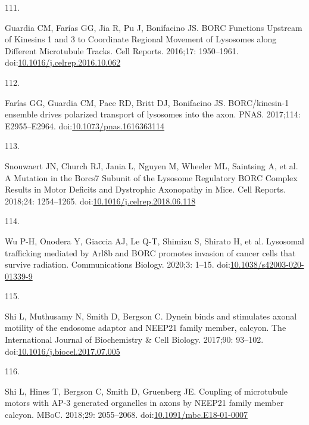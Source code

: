 \documentclass[
  12pt,
  a4paper,
]{book}
\newlength{\cslhangindent}
\newlength{\csllabelwidth}
\newlength{\cslentryspacingunit} %
\newenvironment{CSLReferences}[2] %
 {%
  \setlength{\parindent}{0pt}
  \ifodd #1
  \let\oldpar\par
  \def\par{\hangindent=\cslhangindent\oldpar}
  \fi
  \setlength{\parskip}{#2\cslentryspacingunit}
 }%
 {}
\newcommand{\CSLLeftMargin}[1]{\parbox[t]{\csllabelwidth}{#1}}
\newcommand{\CSLRightInline}[1]{\parbox[t]{\linewidth - \csllabelwidth}{#1}\break}
\begin{document}
\begin{CSLReferences}{0}{0}
\leavevmode{}%
\CSLLeftMargin{111. }%
\CSLRightInline{Guardia CM, Farías GG, Jia R, Pu J, Bonifacino JS. {BORC Functions Upstream} of {Kinesins} 1 and 3 to {Coordinate Regional Movement} of {Lysosomes} along {Different Microtubule Tracks}. Cell Reports. 2016;17: 1950--1961. doi:\href{https://doi.org/10.1016/j.celrep.2016.10.062}{10.1016/j.celrep.2016.10.062}}

\leavevmode{}%
\CSLLeftMargin{112. }%
\CSLRightInline{Farías GG, Guardia CM, Pace RD, Britt DJ, Bonifacino JS. {BORC}/kinesin-1 ensemble drives polarized transport of lysosomes into the axon. PNAS. 2017;114: E2955--E2964. doi:\href{https://doi.org/10.1073/pnas.1616363114}{10.1073/pnas.1616363114}}

\leavevmode{}%
\CSLLeftMargin{113. }%
\CSLRightInline{Snouwaert JN, Church RJ, Jania L, Nguyen M, Wheeler ML, Saintsing A, et al. A {Mutation} in the {Borcs7 Subunit} of the {Lysosome Regulatory BORC Complex Results} in {Motor Deficits} and {Dystrophic Axonopathy} in {Mice}. Cell Reports. 2018;24: 1254--1265. doi:\href{https://doi.org/10.1016/j.celrep.2018.06.118}{10.1016/j.celrep.2018.06.118}}

\leavevmode{}%
\CSLLeftMargin{114. }%
\CSLRightInline{Wu P-H, Onodera Y, Giaccia AJ, Le Q-T, Shimizu S, Shirato H, et al. Lysosomal trafficking mediated by {Arl8b} and {BORC} promotes invasion of cancer cells that survive radiation. Communications Biology. 2020;3: 1--15. doi:\href{https://doi.org/10.1038/s42003-020-01339-9}{10.1038/s42003-020-01339-9}}

\leavevmode{}%
\CSLLeftMargin{115. }%
\CSLRightInline{Shi L, Muthusamy N, Smith D, Bergson C. Dynein binds and stimulates axonal motility of the endosome adaptor and {NEEP21} family member, calcyon. The International Journal of Biochemistry \& Cell Biology. 2017;90: 93--102. doi:\href{https://doi.org/10.1016/j.biocel.2017.07.005}{10.1016/j.biocel.2017.07.005}}

\leavevmode{}%
\CSLLeftMargin{116. }%
\CSLRightInline{Shi L, Hines T, Bergson C, Smith D, Gruenberg JE. Coupling of microtubule motors with {AP-3} generated organelles in axons by {NEEP21} family member calcyon. MBoC. 2018;29: 2055--2068. doi:\href{https://doi.org/10.1091/mbc.E18-01-0007}{10.1091/mbc.E18-01-0007}}


\end{CSLReferences}
\end{document}

